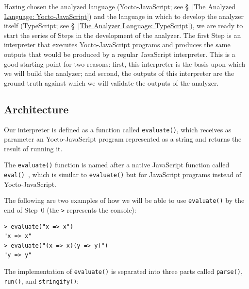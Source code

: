 \documentclass[12pt, oneside]{book}
\begin{document}
Having chosen the analyzed language (Yocto-JavaScript; see §~\ref{The Analyzed Language: Yocto-JavaScript}) and the language in which to develop the analyzer itself (TypeScript; see §~\ref{The Analyzer Language: TypeScript}), we are ready to start the series of Steps in the development of the analyzer. The first Step is an interpreter that executes Yocto-JavaScript programs and produces the same outputs that would be produced by a regular JavaScript interpreter. This is a good starting point for two reasons: first, this interpreter is the basis upon which we will build the analyzer; and second, the outputs of this interpreter are the ground truth against which we will validate the outputs of the analyzer.

\subsection{Architecture}
\label{Architecture}

Our interpreter is defined as a function called \texttt{evaluate()}, which receives as parameter an Yocto-JavaScript program represented as a string and returns the result of running it.

\begin{mdframed}[frametitle = {Advanced}]
The \texttt{evaluate()} function is named after a native JavaScript function called \texttt{eval()}~\cite{eval}, which is similar to \texttt{evaluate()} but for JavaScript programs instead of Yocto-JavaScript.
\end{mdframed}

The following are two examples of how we will be able to use \texttt{evaluate()} by the end of Step~0 (the \texttt{>} represents the console):

\begin{verbatim}
> evaluate("x => x")
"x => x"
> evaluate("(x => x)(y => y)")
"y => y"
\end{verbatim}

The implementation of \texttt{evaluate()} is separated into three parts called \texttt{parse()}, \texttt{run()}, and \texttt{stringify()}:
\end{document}
